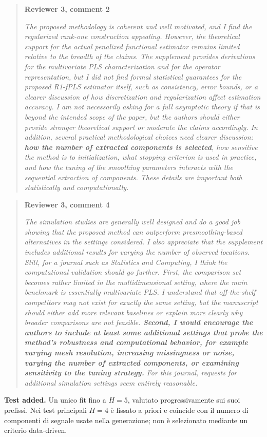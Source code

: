 \documentclass[11pt,a4paper]{article}
\newcommand{\reviewcomment}[2]{%
  \begin{quote}\small
  \textbf{#1}\par
  \emph{#2}
  \end{quote}
}
\newcommand{\reviewhighlight}[1]{\textcolor{blue!70!black}{\textbf{#1}}}
\begin{document}
\reviewcomment{Reviewer 3, comment 2}{
The proposed methodology is coherent and well motivated, and I find the regularized rank-one
construction appealing. However, the theoretical support for the actual penalized functional
estimator remains limited relative to the breadth of the claims. The supplement provides derivations
for the multivariate PLS characterization and for the operator representation, but I did not find
formal statistical guarantees for the proposed R1-fPLS estimator itself, such as consistency, error
bounds, or a clearer discussion of how discretization and regularization affect estimation accuracy.
I am not necessarily asking for a full asymptotic theory if that is beyond the intended scope of the
paper, but the authors should either provide stronger theoretical support or moderate the claims
accordingly.
In addition, several practical methodological choices need clearer discussion:
\reviewhighlight{how the number of extracted components is selected}, how sensitive the method
is to initialization, what stopping criterion is used in practice, and how the tuning of the
smoothing parameters interacts with the sequential extraction of components. These details are
important both statistically and computationally.}

\reviewcomment{Reviewer 3, comment 4}{
The simulation studies are generally well designed and do a good job showing that the proposed
method can outperform presmoothing-based alternatives in the settings considered. I also
appreciate that the supplement includes additional results for varying the number of observed
locations. Still, for a journal such as Statistics and Computing, I think the computational
validation should go further. First, the comparison set becomes rather limited in the
multidimensional setting, where the main benchmark is essentially multivariate PLS. I
understand that off-the-shelf competitors may not exist for exactly the same setting, but the
manuscript should either add more relevant baselines or explain more clearly why broader
comparisons are not feasible. \reviewhighlight{Second, I would encourage the authors to
include at least some additional settings that probe the method's robustness and computational
behavior, for example varying mesh resolution, increasing missingness or noise, varying the
number of extracted components, or examining sensitivity to the tuning strategy.} For this
journal, requests for additional simulation settings seem entirely reasonable.}

\textbf{Test added.} Un unico fit fino a $H=5$, valutato progressivamente sui suoi prefissi.
Nei test principali $H=4$ è fissato a priori e coincide con il numero di componenti di segnale
usate nella generazione; non è selezionato mediante un criterio data-driven.
\end{document}
